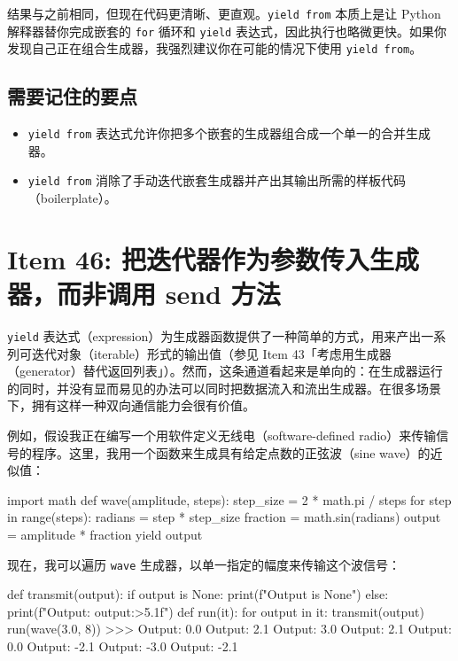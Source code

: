 结果与之前相同，但现在代码更清晰、更直观。\texttt{yield from} 本质上是让 Python 解释器替你完成嵌套的 \texttt{for} 循环和 \texttt{yield} 表达式，因此执行也略微更快。如果你发现自己正在组合生成器，我强烈建议你在可能的情况下使用 \texttt{yield from}。

\subsection{需要记住的要点}

\begin{itemize}
\item \texttt{yield from} 表达式允许你把多个嵌套的生成器组合成一个单一的合并生成器。
\item \texttt{yield from} 消除了手动迭代嵌套生成器并产出其输出所需的样板代码（boilerplate）。
\end{itemize}

\section{Item 46: 把迭代器作为参数传入生成器，而非调用 send 方法}

\texttt{yield} 表达式（expression）为生成器函数提供了一种简单的方式，用来产出一系列可迭代对象（iterable）形式的输出值（参见 Item 43「考虑用生成器（generator）替代返回列表」）。然而，这条通道看起来是单向的：在生成器运行的同时，并没有显而易见的办法可以同时把数据流入和流出生成器。在很多场景下，拥有这样一种双向通信能力会很有价值。

例如，假设我正在编写一个用软件定义无线电（software-defined radio）来传输信号的程序。这里，我用一个函数来生成具有给定点数的正弦波（sine wave）的近似值：

\begin{codebox}[python]
import math
def wave(amplitude, steps):
    step_size = 2 * math.pi / steps
    for step in range(steps):
        radians = step * step_size
        fraction = math.sin(radians)
        output = amplitude * fraction
        yield output
\end{codebox}

现在，我可以遍历 \texttt{wave} 生成器，以单一指定的幅度来传输这个波信号：

\begin{codebox}[python]
def transmit(output):
    if output is None:
        print(f"Output is None")
    else:
        print(f"Output: {output:>5.1f}")
def run(it):
    for output in it:
        transmit(output)
run(wave(3.0, 8))
>>>
Output:   0.0
Output:   2.1
Output:   3.0
Output:   2.1
Output:   0.0
Output:  -2.1
Output:  -3.0
Output:  -2.1
\end{codebox}

